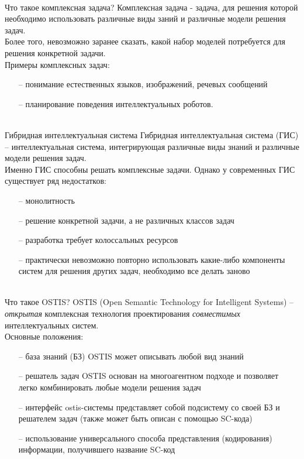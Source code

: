 \begin{frame}{\\Что такое комплексная задача?}
	Комплексная задача - задача, для решения которой необходимо использовать различные виды заний и различные модели решения задач. \\ \vspace{3mm}
	Более того, невозможно заранее сказать, какой набор моделей потребуется для решения конкретной задачи. \\
	\vspace{5mm}
	Примеры комплексных задач:
	\begin{itemize}
		\item[--] понимание естественных языков, изображений, речевых сообщений \\
		\item[--] планирование поведения интеллектуальных роботов.
	\end{itemize}
\end{frame}

\begin{frame}{\\Гибридная интеллектуальная система}
	Гибридная интеллектуальная система (ГИС) -- интеллектуальная система, интегрирующая различные виды знаний и различные модели решения задач.\\
	Именно ГИС способны решать комплексные задачи. Однако у современных ГИС существует ряд недостатков:
	\begin{itemize}
		\item[--] монолитность 
		\item[--] решение конкретной задачи, а не различных классов задач
		\item[--] разработка требует колоссальных ресурсов
		\item[--] практически невозможно повторно использовать какие-либо компоненты систем для решения других задач, необходимо все делать заново
	\end{itemize}
\end{frame}

\begin{frame}{\\Что такое OSTIS?}
	\vspace{5mm}
	OSTIS (Open Semantic Technology for Intelligent Systems) – \textit{открытая} комплексная технология проектирования \textit{совместимых} интеллектуальных систем.\\
	Основные положения:
		\begin{itemize}
		\item[--] база знаний (БЗ) OSTIS может описывать любой вид знаний
		\item[--] решатель задач OSTIS основан на многоагентном подходе и позволяет легко комбинировать любые модели решения задач
		\item[--] интерфейс ostis-системы представляет собой подсистему со своей БЗ и решателем задач (также может быть описан с помощью SC-кода)
		\item[--] использование универсального способа представления (кодирования) информации, получившего название SC-код 
	\end{itemize}
\end{frame}


